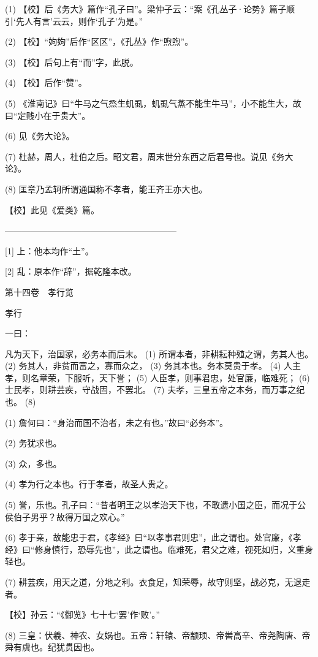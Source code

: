 \documentclass[12pt,UTF8]{ctexbook}
\begin{document}
(1) 【校】后《务大》篇作“孔子曰”。梁仲子云：“案《孔丛子·论势》篇子顺引‘先人有言’云云，则作‘孔子’为是。”

(2) 【校】“姁姁”后作“区区”，《孔丛》作“喣喣”。

(3) 【校】后句上有“而”字，此脱。

(4) 【校】后作“赞”。

(5) 《淮南记》曰“牛马之气烝生虮虱，虮虱气蒸不能生牛马”，小不能生大，故曰“定贱小在于贵大”。

(6) 见《务大论》。

(7) 杜赫，周人，杜伯之后。昭文君，周末世分东西之后君号也。说见《务大论》。

(8) 匡章乃孟轲所谓通国称不孝者，能王齐王亦大也。

【校】此见《爱类》篇。




————————————————————

[1] 上：他本均作“土”。

[2] 乱：原本作“辞”，据乾隆本改。





第十四卷　孝行览



孝行


一曰：

凡为天下，治国家，必务本而后末。 (1) 所谓本者，非耕耘种殖之谓，务其人也。 (2) 务其人，非贫而富之，寡而众之， (3) 务其本也。务本莫贵于孝。 (4) 人主孝，则名章荣，下服听，天下誉； (5) 人臣孝，则事君忠，处官廉，临难死； (6) 士民孝，则耕芸疾，守战固，不罢北。 (7) 夫孝，三皇五帝之本务，而万事之纪也。 (8)

(1) 詹何曰：“身治而国不治者，未之有也。”故曰“必务本”。

(2) 务犹求也。

(3) 众，多也。

(4) 孝为行之本也。行于孝者，故圣人贵之。

(5) 誉，乐也。孔子曰：“昔者明王之以孝治天下也，不敢遗小国之臣，而况于公侯伯子男乎？故得万国之欢心。”

(6) 孝于亲，故能忠于君，《孝经》曰“以孝事君则忠”，此之谓也。处官廉，《孝经》曰“修身慎行，恐辱先也”，此之谓也。临难死，君父之难，视死如归，义重身轻也。

(7) 耕芸疾，用天之道，分地之利。衣食足，知荣辱，故守则坚，战必克，无退走者。

【校】孙云：“《御览》七十七‘罢’作‘败’。”

(8) 三皇：伏羲、神农、女娲也。五帝：轩辕、帝颛顼、帝喾高辛、帝尧陶唐、帝舜有虞也。纪犹贯因也。
\end{document}
